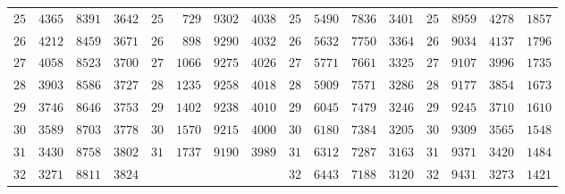 \begin{center}
{{\begin{minipage}{.96\linewidth}
\begin{tabular}{r|r|r|r||r|r|r|r||r|r|r|r||r|r|r|r}
$25$ & $4365$ & $8391$ & $3642$ & $25$ & $729$ & $9302$ & $4038$ & $25$ & $5490$ & $7836$ & $3401$ & $25$ & $8959$ & $4278$ & $1857$\\[3pt]
$26$ & $4212$ & $8459$ & $3671$ & $26$ & $898$ & $9290$ & $4032$ & $26$ & $5632$ & $7750$ & $3364$ & $26$ & $9034$ & $4137$ & $1796$\\
$27$ & $4058$ & $8523$ & $3700$ & $27$ & $1066$ & $9275$ & $4026$ & $27$ & $5771$ & $7661$ & $3325$ & $27$ & $9107$ & $3996$ & $1735$\\
$28$ & $3903$ & $8586$ & $3727$ & $28$ & $1235$ & $9258$ & $4018$ & $28$ & $5909$ & $7571$ & $3286$ & $28$ & $9177$ & $3854$ & $1673$\\
$29$ & $3746$ & $8646$ & $3753$ & $29$ & $1402$ & $9238$ & $4010$ & $29$ & $6045$ & $7479$ & $3246$ & $29$ & $9245$ & $3710$ & $1610$\\
$30$ & $3589$ & $8703$ & $3778$ & $30$ & $1570$ & $9215$ & $4000$ & $30$ & $6180$ & $7384$ & $3205$ & $30$ & $9309$ & $3565$ & $1548$\\[3pt]
$31$ & $3430$ & $8758$ & $3802$ & $31$ & $1737$ & $9190$ & $3989$ & $31$ & $6312$ & $7287$ & $3163$ & $31$ & $9371$ & $3420$ & $1484$\\
$32$ & $3271$ & $8811$ & $3824$ &  &  &  &  & $32$ & $6443$ & $7188$ & $3120$ & $32$ & $9431$ & $3273$ & $1421$\\
\end{tabular}\endgroup
\end{minipage}}}\endgroup
\end{center}
\clearpage
{}%
